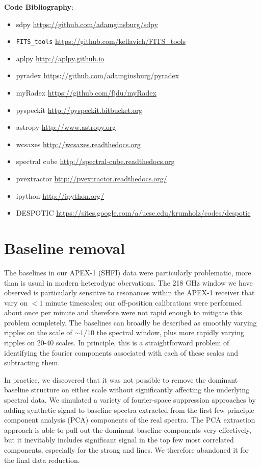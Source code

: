 \textbf{Code Bibliography}:

\begin{itemize}
    \item sdpy \url{https://github.com/adamginsburg/sdpy}
    \item \texttt{FITS\_tools} \url{https://github.com/keflavich/FITS_tools}
    \item aplpy \url{http://aplpy.github.io}
    \item pyradex \url{https://github.com/adamginsburg/pyradex}
    \item myRadex \url{https://github.com/fjdu/myRadex}
    \item pyspeckit \url{http://pyspeckit.bitbucket.org} \citep{Ginsburg2011c}
    \item astropy \url{http://www.astropy.org} \citep{Astropy-Collaboration2013a}
    \item wcsaxes \url{http://wcsaxes.readthedocs.org}
    \item spectral cube \url{http://spectral-cube.readthedocs.org}
    \item pvextractor \url{http://pvextractor.readthedocs.org/}
    \item ipython \url{http://ipython.org/} \citep{Perez2007a}
    \item DESPOTIC \url{https://sites.google.com/a/ucsc.edu/krumholz/codes/despotic} \citep{Krumholz2014c}
\end{itemize}

\appendix
\section{Baseline removal}
\label{sec:baselineappendix}
The baselines in our APEX-1 (SHFI) data were particularly problematic, more than is
usual in modern heterodyne obervations.  The 218 GHz window we have observed is
particularly sensitive to resonances within the APEX-1 receiver that vary on
$<1$ minute timescales; our off-position calibrations were performed about once
per minute and therefore were not rapid enough to mitigate this problem
completely.  The baselines can broadly be described as smoothly varying ripples
on the scale of $\sim1/10$ the spectral window, plus more rapidly varying
ripples on 20-40 \kms scales.  In principle, this is a straightforward problem
of identifying the fourier components associated with each of these scales and
subtracting them.

In practice, we discovered that it was not possible to remove the dominant
baseline structure on either scale without significantly affecting the
underlying spectral data.  We simulated a variety of fourier-space suppression
approaches by adding synthetic signal to baseline spectra extracted from the
first few principle component analysis (PCA) components of the real spectra.
The PCA extraction approach is able to pull out the dominant baseline
components very effectively, but it inevitably includes significant signal in
the top few most correlated components, especially for the strong \formaldehyde
and \thirteenco lines.  We therefore abandoned it for the final data reduction.

